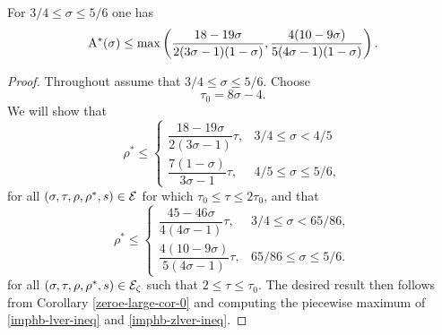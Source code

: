 \begin{theorem}\label{imp-hb-energy-bound}
For $3/4 \le \sigma \le 5/6$ one has
\[
\mathrm{A}^*(\sigma) \le \max\left(\frac{18 - 19\sigma}{2(3\sigma - 1)(1-\sigma)}, \frac{4(10 - 9\sigma)}{5(4\sigma - 1)(1 - \sigma)}\right).
\]
\end{theorem}

\derived
{}

\begin{proof}
Throughout assume that $3/4 \le \sigma \le 5/6$. Choose
\[
\tau_0 = 8\sigma - 4.
\]
We will show that
\begin{equation}\label{imphb-lver-ineq}
\rho^* \le \begin{cases}
\dfrac{18 - 19\sigma}{2(3\sigma - 1)}\tau,&3/4 \le \sigma < 4/5\\
\dfrac{7(1 - \sigma)}{3\sigma - 1}\tau,&4/5 \le \sigma \le 5/6,
\end{cases}
\end{equation}
for all $(\sigma, \tau, \rho, \rho^*, s) \in \mathcal{E}$ for which $\tau_0 \le \tau \le 2\tau_0$, and that
\begin{equation}\label{imphb-zlver-ineq}
\rho^* \le \begin{cases}
\dfrac{45 - 46\sigma}{4(4\sigma - 1)}\tau,&3/4 \le \sigma < 65/86,\\
\dfrac{4(10 - 9\sigma)}{5(4\sigma - 1)}\tau,&65/86 \le \sigma \le 5/6.
\end{cases}
\end{equation}
for all $(\sigma, \tau, \rho, \rho^*, s) \in \mathcal{E}_\zeta$ such that $2 \le \tau \le \tau_0$. The desired result then follows from Corollary \ref{zeroe-large-cor-0} and computing the piecewise maximum of \eqref{imphb-lver-ineq} and \eqref{imphb-zlver-ineq}.


\end{proof}
